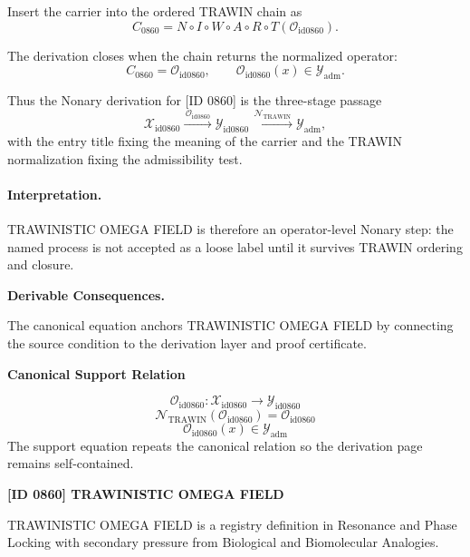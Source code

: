 Insert the carrier into the ordered TRAWIN chain as\[
C_{0860}=N\circ I\circ W\circ A\circ R\circ T(\mathcal{O}_{\mathrm{id0860}}).
\]

The derivation closes when the chain returns the normalized operator:\[
C_{0860}=\mathcal{O}_{\mathrm{id0860}},\qquad \mathcal{O}_{\mathrm{id0860}}(x)\in\mathcal{Y}_{\mathrm{adm}}.
\]

Thus the Nonary derivation for [ID 0860] is the three-stage passage
\[
\mathcal{X}_{\mathrm{id0860}}\xrightarrow{\,\mathcal{O}_{\mathrm{id0860}}\,} \mathcal{Y}_{\mathrm{id0860}}\xrightarrow{\,\mathcal{N}_{\mathrm{TRAWIN}}\,} \mathcal{Y}_{\mathrm{adm}},
\]
with the entry title fixing the meaning of the carrier and the TRAWIN normalization fixing the admissibility test.

\paragraph{Interpretation.} TRAWINISTIC OMEGA FIELD is therefore an operator-level Nonary step: the named process is not accepted as a loose label until it survives TRAWIN ordering and closure.

\par\vspace{0.35em}
\noindent\textbf{Derivable Consequences.}\quad
\begingroup
\footnotesize
\raggedright
The canonical equation anchors TRAWINISTIC OMEGA FIELD by connecting the source condition to the derivation layer and proof certificate.
\par\endgroup

\noindent\textbf{Canonical Support Relation}\par
\[
\mathcal{O}_{\mathrm{id0860}}:\mathcal{X}_{\mathrm{id0860}}\longrightarrow\mathcal{Y}_{\mathrm{id0860}}
\]
\[
\mathcal{N}_{\mathrm{TRAWIN}}(\mathcal{O}_{\mathrm{id0860}})=\mathcal{O}_{\mathrm{id0860}}
\]
\[
\mathcal{O}_{\mathrm{id0860}}(x)\in\mathcal{Y}_{\mathrm{adm}}
\]
\noindent The support equation repeats the canonical relation so the derivation page remains self-contained.\par

\clearpage
\noindent\textbf{[ID 0860] TRAWINISTIC OMEGA FIELD}\par
\vspace{0.35em}
\begingroup\small
{}
TRAWINISTIC OMEGA FIELD is a registry definition in Resonance and Phase Locking with secondary pressure from Biological and Biomolecular Analogies.

